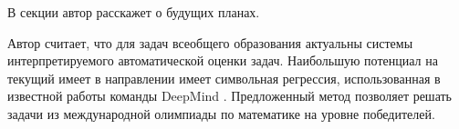 В секции автор расскажет о будущих планах.

Автор считает, что для задач всеобщего образования актуальны системы интерпретируемого автоматической оценки задач.
Наибольшую потенциал на текущий имеет в направлении имеет символьная регрессия,
использованная в известной работы команды DeepMind \cite{trinh2024solving}. Предложенный метод позволяет решать
задачи из международной олимпиады по математике на уровне победителей.




